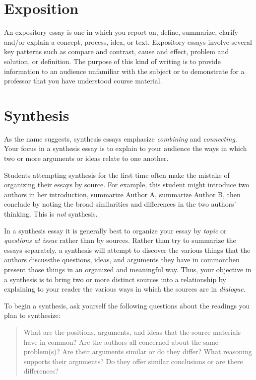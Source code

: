 \section{Exposition} An expository essay is one in which you report on, define,
summarize, clarify and/or explain a concept, process, idea, or text. Expository
essays involve several key patterns such as compare and contrast, cause and
effect, problem and solution, or definition. The purpose of this kind of
writing is to provide information to an audience unfamiliar with the subject or
to demonstrate for a professor that you have understood course material.

\hypertarget{synthesisessay}{} \section{Synthesis}

As the name suggests, synthesis essays emphasize \emph{combining} and
\emph{connecting}. Your focus in a synthesis essay is to explain to your
audience the ways in which two or more arguments or ideas relate to one another.

Students attempting synthesis for the first time often make the mistake of
organizing their essays by source. For example, this student might introduce two
authors in her introduction, summarize Author A, summarize Author B, then
conclude by noting the broad similarities and differences in the two authors'
thinking. This is \emph{not} synthesis.

In a synthesis essay it is generally best to organize your essay by \emph{topic} or
\emph{questions at issue} rather than by sources. Rather than try to summarize
the essays separately, a synthesis will attempt to discover the various things
that the authors discuss\textemdash the questions, ideas, and arguments they
have in common\textemdash then present those things in an organized and
meaningful way. Thus, your objective in a synthesis is to bring two or more
distinct sources into a relationship by explaining to your reader the various
ways in which the sources are in \emph{dialogue}.

To begin a synthesis, ask yourself the following questions about the readings
you plan to synthesize: \begin{quote} What are the positions, arguments, and
ideas that the source materials have in common? Are the authors all concerned
about the same problem(s)?  Are their arguments similar or do they differ? What
reasoning supports their arguments? Do they offer similar conclusions or are
there differences? \end{quote}

